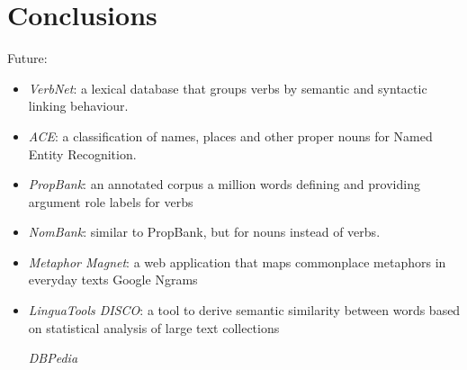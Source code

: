\def\baselinestretch{1}
\chapter{Conclusions}
\ifpdf
    \graphicspath{{Conclusions/ConclusionsFigs/PNG/}{Conclusions/ConclusionsFigs/PDF/}{Conclusions/ConclusionsFigs/}}
\else
    \graphicspath{{Conclusions/ConclusionsFigs/EPS/}{Conclusions/ConclusionsFigs/}}
\fi

\def\baselinestretch{1.66}

Future:
\begin{itemize}
\item{\textit{VerbNet}: a lexical database that groups verbs by semantic and syntactic linking behaviour.\cite{schuler2005verbnet}}
\item{\textit{ACE}: a classification of names, places and other proper nouns for Named Entity Recognition.\cite{doddington2004automatic}}
\item{\textit{PropBank}: an annotated corpus a million words defining and providing argument role labels for verbs\cite{kingsbury2002treebank}}
\item{\textit{NomBank}: similar to PropBank, but for nouns instead of verbs.\cite{meyers2004nombank}}
\item{\textit{Metaphor Magnet}: a web application that maps commonplace metaphors in everyday texts\cite{vealespecifying}}
Google Ngrams
\item{\textit{LinguaTools DISCO}: a tool to derive semantic similarity between words based on statistical analysis of large text collections\cite{kolb2008disco}}

\textit{DBPedia}
\end{itemize}




